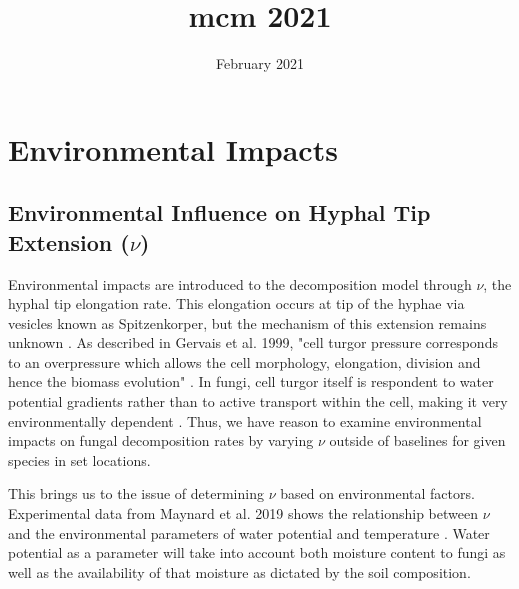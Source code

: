 \documentclass{article}
\title{mcm 2021}
\author{}
\date{February 2021}
\begin{document}
\maketitle

\section{Environmental Impacts}

\subsection{Environmental Influence on Hyphal Tip Extension ($\nu$)}
Environmental impacts are introduced to the decomposition model through $\nu$, the hyphal tip elongation rate. This elongation occurs at tip of the hyphae via vesicles known as Spitzenkorper, but the mechanism of this extension remains unknown \cite{Steinberg2007}. As described in Gervais et al. 1999, "cell turgor pressure corresponds to an overpressure which allows the cell morphology, elongation, division and hence the biomass evolution" \cite{Gervais1999}. In fungi, cell turgor itself is respondent to water potential gradients rather than to active transport within the cell, making it very environmentally dependent \cite{Gervais1999}. Thus, we have reason to examine environmental impacts on fungal decomposition rates by varying $\nu$ outside of baselines for given species in set locations.

This brings us to the issue of determining $\nu$ based on environmental factors. Experimental data from Maynard et al. 2019 shows the relationship between $\nu$ and the environmental parameters of water potential and temperature \cite{Maynard2019}.  Water potential as a parameter will take into account both moisture content to fungi as well as the availability of that moisture as dictated by the  soil composition.
\end{document}
